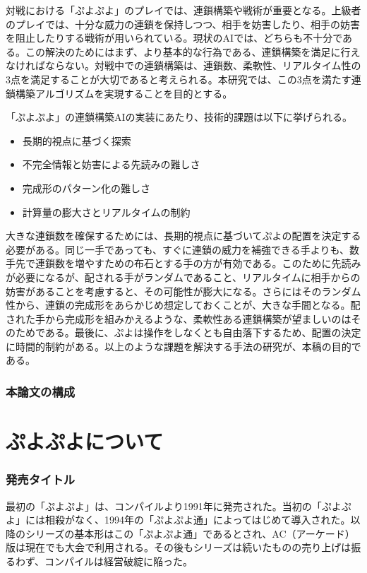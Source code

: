 \documentclass[12pt]{jsarticle}
\begin{document}
対戦における「ぷよぷよ」のプレイでは、連鎖構築や戦術が重要となる。上級者のプレイでは、十分な威力の連鎖を保持しつつ、相手を妨害したり、相手の妨害を阻止したりする戦術が用いられている。現状のAIでは、どちらも不十分である。この解決のためにはまず、より基本的な行為である、連鎖構築を満足に行えなければならない。対戦中での連鎖構築は、連鎖数、柔軟性、リアルタイム性の3点を満足することが大切であると考えられる。本研究では、この3点を満たす連鎖構築アルゴリズムを実現することを目的とする。

「ぷよぷよ」の連鎖構築AIの実装にあたり、技術的課題は以下に挙げられる。
\begin{itemize}
\item 長期的視点に基づく探索
\item 不完全情報と妨害による先読みの難しさ
\item 完成形のパターン化の難しさ
\item 計算量の膨大さとリアルタイムの制約
\end{itemize}
大きな連鎖数を確保するためには、長期的視点に基づいてぷよの配置を決定する必要がある。同じ一手であっても、すぐに連鎖の威力を補強できる手よりも、数手先で連鎖数を増やすための布石とする手の方が有効である。このために先読みが必要になるが、配される手がランダムであること、リアルタイムに相手からの妨害があることを考慮すると、その可能性が膨大になる。さらにはそのランダム性から、連鎖の完成形をあらかじめ想定しておくことが、大きな手間となる。配された手から完成形を組みかえるような、柔軟性ある連鎖構築が望ましいのはそのためである。最後に、ぷよは操作をしなくとも自由落下するため、配置の決定に時間的制約がある。以上のような課題を解決する手法の研究が、本稿の目的である。

\section{本論文の構成}


\part{ぷよぷよについて} \setcounter{section}{0}
\section{発売タイトル}
最初の「ぷよぷよ」は、コンパイルより1991年に発売された。当初の「ぷよぷよ」には相殺がなく、1994年の「ぷよぷよ通」によってはじめて導入された。以降のシリーズの基本形はこの「ぷよぷよ通」であるとされ、AC（アーケード）版は現在でも大会で利用される。その後もシリーズは続いたものの売り上げは振るわず、コンパイルは経営破綻に陥った。
\end{document}
